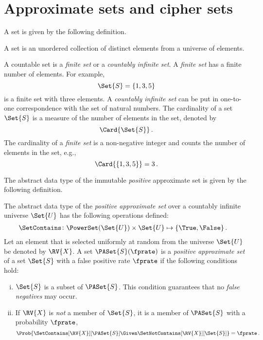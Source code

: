 \documentclass[ ../main.tex]{subfiles}
\begin{document}
\section{Approximate sets and cipher sets}
A set is given by the following definition.
\begin{definition}
A set is an unordered collection of distinct elements from a universe of elements.
\end{definition}
A countable set is a \emph{finite set} or a \emph{countably infinite set}. A \emph{finite set} has a finite number of elements. For example,
\[
    \Set{S} = \{ 1, 3, 5 \}
\]
is a finite set with three elements. A \emph{countably infinite set} can be put in one-to-one correspondence with the set of natural numbers. The cardinality of a set $\Set{S}$ is a measure of the number of elements in the set, denoted by
\begin{equation}
    \Card{\Set{S}}\,.
\end{equation}
The cardinality of a \emph{finite set} is a non-negative integer and counts the number of elements in the set, e.g.,
\[
    \Card{\left\{ 1, 3, 5\right\}} = 3\,.
\]

The abstract data type of the immutable \emph{positive} approximate set\cite{aset} is given by the following definition.
\begin{definition}
\label{def:approx_set}
The abstract data type of the \emph{positive approximate set} over a countably infinite universe $\Set{U}$ has the following operations defined:
\begin{align}
    &\SetContains \colon \PowerSet(\Set{U}) \times \Set{U} \mapsto \{ \True, \False \}\,.
\end{align}
Let an element that is selected uniformly at random from the universe $\Set{U}$ be denoted by $\RV{X}$.
A set $\PASet{S}(\fprate)$ is a \emph{positive approximate set} of a set $\Set{S}$ with a false positive rate $\fprate$ if the following conditions hold:
\begin{enumerate}[(i)]
    \item $\Set{S}$ is a subset of $\PASet{S}$.
    This condition guarantees that no \emph{false negatives} may occur.
    \item If $\RV{X}$ is \emph{not} a member of $\Set{S}$, it is a member of $\PASet{S}$ with a probability $\fprate$,
    \begin{equation}
        \Prob{\SetContains[\RV{X}][\PASet{S}] \Given \SetNotContains[\RV{X}][\Set{S}]} = \fprate\,.
    \end{equation}
\end{enumerate}
\end{definition}
\end{document}
